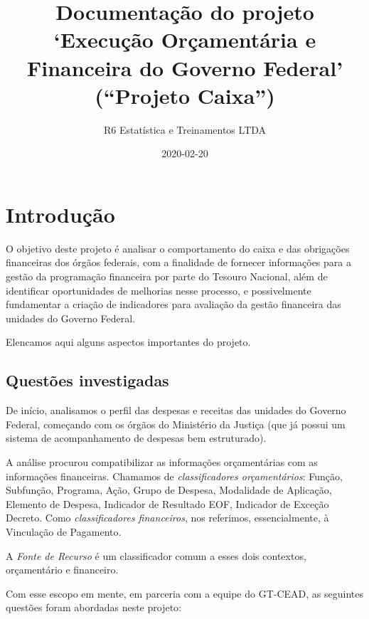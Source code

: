 \documentclass[
]{book}
\title{Documentação do projeto `Execução Orçamentária e Financeira do Governo Federal' (``Projeto Caixa'')}
\author{R6 Estatística e Treinamentos LTDA}
\date{2020-02-20}
\begin{document}
\frontmatter
\maketitle

{
\setcounter{tocdepth}{1}
\tableofcontents
}
\mainmatter
\hypertarget{introduuxe7uxe3o}{%
\chapter{Introdução}\label{introduuxe7uxe3o}}

O objetivo deste projeto é analisar o comportamento do caixa e das obrigações financeiras dos órgãos federais, com a finalidade de fornecer informações para a gestão da programação financeira por parte do Tesouro Nacional, além de identificar oportunidades de melhorias nesse processo, e possivelmente fundamentar a criação de indicadores para avaliação da gestão financeira das unidades do Governo Federal.

Elencamos aqui alguns aspectos importantes do projeto.

\hypertarget{questuxf5es-investigadas}{%
\section{Questões investigadas}\label{questuxf5es-investigadas}}

De início, analisamos o perfil das despesas e receitas das unidades do Governo Federal, começando com os órgãos do Ministério da Justiça (que já possui um sistema de acompanhamento de despesas bem estruturado).

A análise procurou compatibilizar as informações orçamentárias com as informações financeiras. Chamamos de \emph{classificadores orçamentários}: Função, Subfunção, Programa, Ação, Grupo de Despesa, Modalidade de Aplicação, Elemento de Despesa, Indicador de Resultado EOF, Indicador de Exceção Decreto. Como \emph{classificadores financeiros}, nos referimos, essencialmente, à Vinculação de Pagamento.

A \emph{Fonte de Recurso} é um classificador comum a esses dois contextos, orçamentário e financeiro.

Com esse escopo em mente, em parceria com a equipe do GT-CEAD, as seguintes questões foram abordadas neste projeto:
\end{document}
